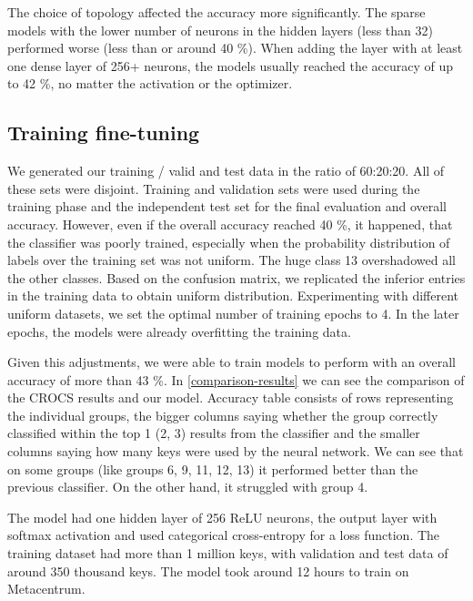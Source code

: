 The choice of topology affected the accuracy more significantly. The sparse models with the lower number of neurons in the hidden layers (less than 32) performed worse (less than or around 40 \%). When adding the layer with at least one dense layer of 256+ neurons, the models usually reached the accuracy of up to 42 \%, no matter the activation or the optimizer.

\subsection*{Training fine-tuning}

We generated our training / valid and test data in the ratio of 60:20:20. All of these sets were disjoint. Training and validation sets were used during the training phase and the independent test set for the final evaluation and overall accuracy. However, even if the overall accuracy reached 40 \%, it happened, that the classifier was poorly trained, especially when the probability distribution of labels over the training set was not uniform. The huge class 13 overshadowed all the other classes. Based on the confusion matrix, we replicated the inferior entries in the training data to obtain uniform distribution. Experimenting with different uniform datasets, we set the optimal number of training epochs to 4. In the later epochs, the models were already overfitting the training data.

Given this adjustments, we were able to train models to perform with an overall accuracy of more than 43 \%. In \autoref{comparison-results} we can see the comparison of the CROCS results and our model. Accuracy table consists of rows representing the individual groups, the bigger columns saying whether the group correctly classified within the top 1 (2, 3) results from the classifier and the smaller columns saying how many keys were used by the neural network. We can see that on some groups (like groups 6, 9, 11, 12, 13) it performed better than the previous classifier. On the other hand, it struggled with group 4.

The model had one hidden layer of 256 ReLU neurons, the output layer with softmax activation and used categorical cross-entropy for a loss function. The training dataset had more than 1 million keys, with validation and test data of around 350 thousand keys. The model took around 12 hours to train on Metacentrum.

